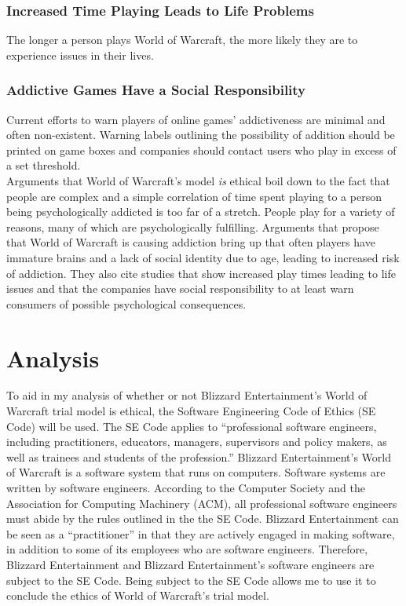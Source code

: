\documentclass[11pt]{article}
\begin{document}
\begin{multicols}{2}
\subsubsection{Increased Time Playing Leads to Life Problems}
The longer a person plays World of Warcraft, the more likely they are to experience issues in their lives. \cite{ProblemUsageAmongHighlyEngagedPlayers}
\subsubsection{Addictive Games Have a Social Responsibility}
Current efforts to warn players of online games' addictiveness are minimal and often non-existent. Warning labels outlining the possibility of addition should be printed on game boxes and companies should contact users who play in excess of a set threshold. \cite{MMORPGSocialResponsibility}\\

Arguments that World of Warcraft's model \emph{is} ethical boil down to the fact that people are complex and a simple correlation of time spent playing to a person being psychologically addicted is too far of a stretch. People play for a variety of reasons, many of which are psychologically fulfilling. Arguments that propose that World of Warcraft is causing addiction bring up that often players have immature brains and a lack of social identity due to age, leading to increased risk of addiction. They also cite studies that show increased play times leading to life issues and that the companies have social responsibility to at least warn consumers of possible psychological consequences.


\section{Analysis}

To aid in my analysis of whether or not Blizzard Entertainment's World of Warcraft trial model is ethical, the Software Engineering Code of Ethics (SE Code) will be used. The SE Code applies to ``professional software engineers, including practitioners, educators, managers, supervisors and policy makers, as well as trainees and students of the profession.'' \cite{SECode} Blizzard Entertainment's World of Warcraft is a software system that runs on computers. \cite{WoWSystemReqs} Software systems are written by software engineers. \cite{ACMApprovesSECode} According to the Computer Society and the Association for Computing Machinery (ACM), all professional software engineers must abide by the rules outlined in the the SE Code. \cite{ACMApprovesSECode}\cite{SECode} Blizzard Entertainment can be seen as a ``practitioner'' in that they are actively engaged in making software, in addition to some of its employees who are software engineers. Therefore, Blizzard Entertainment and Blizzard Entertainment's software engineers are subject to the SE Code. \cite{SECode} Being subject to the SE Code allows me to use it to conclude the ethics of World of Warcraft's trial model.


\end{multicols}
\end{document}
